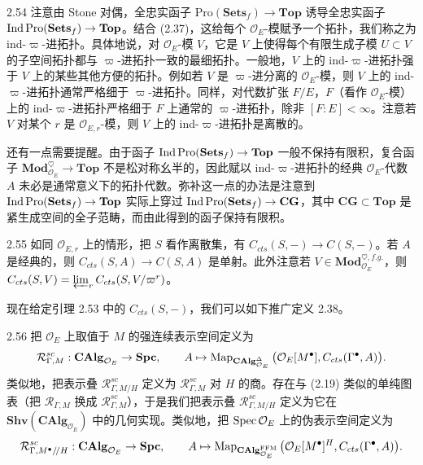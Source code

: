 \begin{rem}{2.54}
注意由 Stone 对偶，全忠实函子 $\mathrm{Pro}(\mathbf{Sets}_f)\to\mathbf{Top}$ 诱导全忠实函子 $\operatorname{Ind}\mathrm{Pro}(\mathbf{Sets}_f)\to\mathbf{Top}$。结合 (2.37)，这给每个 $\mathcal O_E$-模赋予一个拓扑，我们称之为 ind-$\varpi$-进拓扑。具体地说，对 $\mathcal O_E$-模 $V$，它是 $V$ 上使得每个有限生成子模 $U\subset V$ 的子空间拓扑都与 $\varpi$-进拓扑一致的最细拓扑。一般地，$V$ 上的 ind-$\varpi$-进拓扑强于 $V$ 上的某些其他方便的拓扑。例如若 $V$ 是 $\varpi$-进分离的 $\mathcal O_E$-模，则 $V$ 上的 ind-$\varpi$-进拓扑通常严格细于 $\varpi$-进拓扑。同样，对代数扩张 $F/E$，$F$（看作 $\mathcal O_E$-模）上的 ind-$\varpi$-进拓扑严格细于 $F$ 上通常的 $\varpi$-进拓扑，除非 $[F:E]<\infty$。注意若 $V$ 对某个 $r$ 是 $\mathcal O_{E,r}$-模，则 $V$ 上的 ind-$\varpi$-进拓扑是离散的。

还有一点需要提醒。由于函子 $\operatorname{Ind}\mathrm{Pro}(\mathbf{Sets}_f)\to\mathbf{Top}$ 一般不保持有限积，复合函子 $\mathbf{Mod}^{\heartsuit}_{\mathcal O_E}\to\mathbf{Top}$ 不是松对称幺半的，因此赋以 ind-$\varpi$-进拓扑的经典 $\mathcal O_E$-代数 $A$ 未必是通常意义下的拓扑代数。弥补这一点的办法是注意到 $\operatorname{Ind}\mathrm{Pro}(\mathbf{Sets}_f)\to\mathbf{Top}$ 实际上穿过 $\operatorname{Ind}\mathrm{Pro}(\mathbf{Sets}_f)\to\mathbf{CG}$，其中 $\mathbf{CG}\subset\mathbf{Top}$ 是紧生成空间的全子范畴，而由此得到的函子保持有限积。
\end{rem}

\begin{rem}{2.55}
如同 $\mathcal O_{E,r}$ 上的情形，把 $S$ 看作离散集，有 $C_{cts}(S,-)\to C(S,-)$。若 $A$ 是经典的，则 $C_{cts}(S,A)\to C(S,A)$ 是单射。此外注意若 $V\in\mathbf{Mod}^{\heartsuit,f.g.}_{\mathcal O_E}$，则 $C_{cts}(S,V)=\varprojlim_r C_{cts}(S,V/\varpi^r)$。
\end{rem}

现在给定引理 2.53 中的 $C_{cts}(S,-)$，我们可以如下推广定义 2.38。

\begin{defn}{2.56}
把 $\mathcal O_E$ 上取值于 $M$ 的强连续表示空间定义为
\[
\mathcal R^{sc}_{\Gamma,M}:\mathbf{CAlg}_{\mathcal O_E}\to\mathbf{Spc},\qquad
A\mapsto \operatorname{Map}_{\mathbf{CAlg}^{\Delta}_{\mathcal O_E}}\big(\mathcal O_E[M^{\bullet}],C_{cts}(\Gamma^{\bullet},A)\big).
\]
类似地，把表示叠 $\mathcal R^{sc}_{\Gamma,M/H}$ 定义为 $\mathcal R^{sc}_{\Gamma,M}$ 对 $H$ 的商。存在与 (2.19) 类似的单纯图表（把 $\mathcal R_{\Gamma,M}$ 换成 $\mathcal R^{sc}_{\Gamma,M}$），于是我们把表示叠 $\mathcal R^{sc}_{\Gamma,M/H}$ 定义为它在 $\mathbf{Shv}(\mathbf{CAlg}_{\mathcal O_E})$ 中的几何实现。类似地，把 $\operatorname{Spec}\mathcal O_E$ 上的伪表示空间定义为
\[
\mathcal R^{sc}_{\Gamma,M^{\bullet}/\!/H}:\mathbf{CAlg}_{\mathcal O_E}\to\mathbf{Spc},\qquad
A\mapsto \operatorname{Map}_{\mathbf{CAlg}^{\mathrm{FFM}}_{\mathcal O_E}}\big(\mathcal O_E[M^{\bullet}]^{H},C_{cts}(\Gamma^{\bullet},A)\big).
\]
\end{defn}

